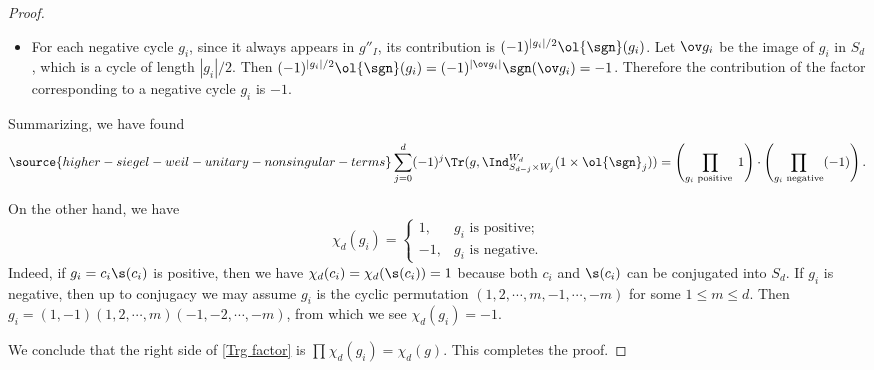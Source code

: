 \begin{proof}
\begin{itemize}
\item For each negative cycle $g_i$, since it always appears in $g''_{I}$, its contribution is  $(-1)^{|g_{i}|/2}\ol{\sgn}(g_i)$. Let  $\ov g_{i}$ be the image of $g_{i}$ in $S_{d}$, which is a cycle of length $|g_{i}|/2$. Then $(-1)^{|g_{i}|/2}\ol{\sgn}(g_i)=(-1)^{|\ov g_{i}|}\sgn(\ov g_{i})=-1$. Therefore the contribution of the factor corresponding to a negative cycle $g_{i}$ is $-1$.
\end{itemize}
Summarizing, we have found
\begin{equation}\label{Trg factor}
\source{higher-siegel-weil-unitary-nonsingular-terms}
\sum_{j=0}^{d} (-1)^{j}\Tr(g, \Ind_{S_{d-j} \times W_j}^{W_d} (1 \times \ol{\sgn}_j)) = \left( \prod_{g_i \text{ positive }} 1 \right) \cdot  \left( \prod_{g_i \text{ negative} }(-1) \right).
\end{equation}

On the other hand,  we have
\begin{equation}
\chi_{d}(g_{i})=\begin{cases} 1, & g_{i} \mbox{ is positive;} \\ -1, &g_{i} \mbox{ is negative.} \end{cases}
\end{equation}
Indeed, if $g_{i}=c_{i}\s(c_{i})$ is positive, then we have $\chi_{d}(c_{i})=\chi_{d}(\s(c_{i}))=1$ because both $c_{i}$ and $\s(c_{i})$ can be conjugated into $S_{d}$. If $g_{i}$ is negative, then up to conjugacy we may assume $g_{i}$ is the cyclic permutation $(1,2,\cdots, m, -1,\cdots, -m)$ for some $1\le m\le d$. Then $g_{i}=(1,-1)(1,2,\cdots, m) (-1,-2,\cdots, -m)$, from which we see $\chi_{d}(g_{i})=-1$.

We conclude that the right side of \eqref{Trg factor} is $\prod_{}\chi_{d}(g_{i})=\chi_{d}(g)$. This completes the proof.



\end{proof}
